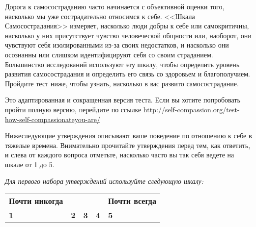 
\vspace{3ex}

Дорога к самосостраданию часто начинается с объективной оценки того, насколько мы уже сострадательно относимся к себе. <<Шкала Самосострадания>> измеряет, насколько люди добры к себе или самокритичны, насколько у них присутствует чувство человеческой общности или, наоборот, они чувствуют себя изолированными из-за своих недостатков, и насколько они осознанны или слишком идентифицируют себя со своим страданием. Большинство исследований используют эту шкалу, чтобы определить уровень развития самосострадания и определить его связь со здоровьем и благополучием. Пройдите тест ниже, чтобы узнать, насколько в вас развито самосострадание. 

\vspace{3ex}

Это адаптированная и сокращенная версия теста. Если вы хотите попробовать пройти полную версию, перейдите по ссылке \newline \url{http://self-compassion.org/test-how-self-compassionateyou-are/}

\vspace{3ex}

Нижеследующие утверждения описывают ваше поведение по отношению к себе в тяжелые времена. Внимательно прочитайте утверждения перед тем, как ответить, и слева от каждого вопроса отметьте, насколько часто вы так себя ведете на шкале от 1 до 5.
 
\vspace{3ex}

\textit{Для первого набора утверждений используйте следующую шкалу:}

\begin{flushright}
	\setlength{\extrarowheight}{2mm}
	\begin{tabularx}{11.5cm}{XXXXX}
		\textbf{Почти никогда} & & & & \textbf{Почти всегда} \\
		\textbf{1} & \textbf{2} & \textbf{3} & \textbf{4} & \textbf{5} \\
	\end{tabularx}
	\setlength{\extrarowheight}{0mm}
\end{flushright}


